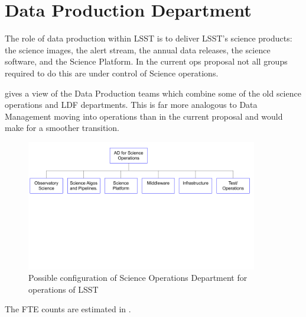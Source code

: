 
\section{Data Production Department }\label{sec:sciops} \label{sec:dataprod}

The role of data production within \gls{LSST} is to deliver \gls{LSST}'s science products: the science images, the alert stream, the annual data releases, the science \gls{software}, and the Science Platform. In the current ops proposal not all groups required to do this are under control of Science operations.

 gives a view of the Data Production teams which combine some of the old science operations  and LDF departments. This is far more analogous to Data Management moving into operations than in the current proposal and would make for a smoother transition.

\begin{figure}
\begin{center}
\includegraphics[width=0.9\textwidth]{figures/SciOpsOrg}
\caption{Possible configuration of Science Operations Department for operations of \gls{LSST} \label{fig:sciopsorg}}
\end{center}
\end{figure}

The FTE counts are estimated in .






